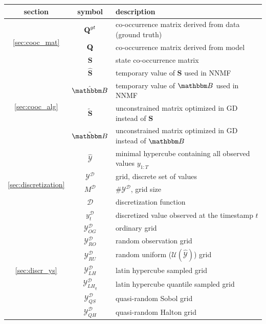 \documentclass[shortabstract]{iithesis}
\begin{document}
    \begin{table}[!ht]
    \centering
    \begin{tabular}{ |c|c|p{9.5cm}| }
 \hline
 section & symbol & description \\
 \hline
 \multirow{3}{*}{\ref{sec:cooc_mat}} 
    & $\textbf Q^{gt}$ & co-occurrence matrix derived from data (ground truth) \\
    & $\textbf Q$ & co-occurrence matrix derived from model \\
    & $\textbf{S}$ & state co-occurrence matrix \\ \hline
 \multirow{4}{*}{\ref{sec:cooc_alg}} 
    & $\hat{\textbf{S}}$ & temporary value of $\textbf{S}$ used in NNMF \\
    & $\hat{\mathbbm B}$ & temporary value of $\mathbbm B$ used in NNMF \\
    & $\tilde{\textbf{S}}$ & unconstrained matrix optimized in GD instead of $\textbf{S}$ \\
    & $\tilde{\mathbbm B}$ & unconstrained matrix optimized in GD  instead of $\mathbbm B$ \\ \hline
 \multirow{5}{*}{\ref{sec:discretization}}
    & $\hat{\mathcal{Y}}$ & minimal hypercube containing all observed values $y_{1:T}$ \\
    & $\mathcal{Y}^{\mathcal{D}}$ & grid, discrete set of values \\
    & $M^{\mathcal{D}}$ & $\#\mathcal{Y}^{\mathcal{D}}$, grid size  \\
    & $\mathcal{D}$ & discretization function \\
    & $y_t^{\mathcal{D}}$ & discretized value observed at the timestamp $t$ \\ \hline
 \multirow{7}{*}{\ref{sec:discr_ys}}
    & $\mathcal Y^{\mathcal D}_{OG}$ & ordinary grid \\
    & $\mathcal Y^{\mathcal D}_{RO}$ & random observation grid \\
    & $\mathcal Y^{\mathcal D}_{RU}$ & random uniform ($\mathcal U (\hat{\mathcal Y})$) grid \\
    & $\mathcal Y^{\mathcal D}_{LH}$ & latin hypercube sampled grid \\
    & $\mathcal Y^{\mathcal D}_{LH_q}$ & latin hypercube quantile sampled grid \\
    & $\mathcal Y^{\mathcal D}_{QS}$ & quasi-random Sobol grid \\
    & $\mathcal Y^{\mathcal D}_{QH}$ & quasi-random Halton grid \\ \hline
    

\end{tabular}
\end{table}
\end{document}
